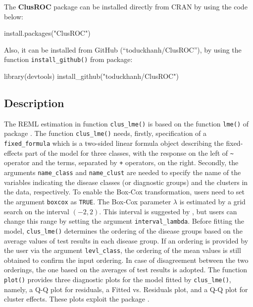 The \textbf{ClusROC} package can be installed directly from CRAN by using the code below:

\begin{example}
  install.packages("ClusROC")
\end{example}
Also, it can be installed from GitHub (``toduckhanh/ClusROC''), by using
the function \texttt{install\_github()} from  package:


\begin{example}
  library(devtools)
  install_github("toduckhanh/ClusROC")
\end{example}


\hypertarget{description}{%
\subsection{Description}\label{description}}

The REML estimation in function {\texttt{clus\_lme()}} is based on the function \texttt{lme()} of package  \citep{nlme}. The function {\texttt{clus\_lme()}} needs, firstly, specification of a {\texttt{fixed\_formula}} which is a two-sided linear formula object describing the fixed-effects part of the model for three classes, with the response on the left of \texttt{\textasciitilde{}} operator and the terms, separated by \texttt{+} operators, on the right. Secondly, the arguments {\texttt{name\_class}} and {\texttt{name\_clust}} are needed to specify the name of the variables indicating the disease classes (or diagnostic groups) and the clusters in the data, respectively. To enable the Box-Cox transformation, users need to set the argument \texttt{boxcox} as \texttt{TRUE}. The Box-Cox parameter $\lambda$ is estimated by a grid search on the interval $(-2, 2)$. This interval is suggested by \citet{gurka2011estimating}, but users can change this range by setting the argument \texttt{interval\_lambda}. Before fitting the model, {\texttt{clus\_lme()}} determines the ordering of the disease groups based on the average values of test results in each disease group. If an ordering is provided by the user via the argument {\texttt{levl\_class}}, the ordering of the mean values is still obtained to confirm the input ordering. In case of disagreement between the two orderings, the one based on the averages of test results is adopted. The function \texttt{plot()} provides three diagnostic plots for the model fitted by {\texttt{clus\_lme()}}, namely, a Q-Q plot for residuals, a Fitted vs. Residuals plot, and a Q-Q plot for cluster effects. These plots exploit the  package \citep{ggplot2}.

